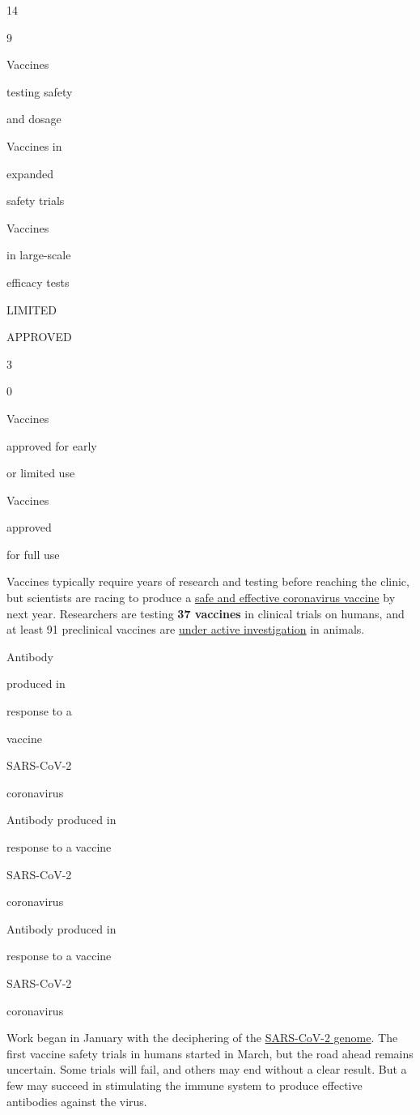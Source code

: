 14

9

Vaccines

testing safety

and dosage

Vaccines in

expanded

safety trials

Vaccines

in large-scale

efficacy tests

LIMITED

APPROVED

3

0

Vaccines

approved for early

or limited use

Vaccines

approved

for full use

Vaccines typically require years of research and testing before reaching
the clinic, but scientists are racing to produce a
\href{https://www.nytimes3xbfgragh.onion/interactive/2020/05/20/science/coronavirus-vaccine-development.html}{safe
and effective coronavirus vaccine} by next year. Researchers are testing
\textbf{37 vaccines} in clinical trials on humans, and at least 91
preclinical vaccines are
\href{https://www.nytimes3xbfgragh.onion/2020/08/27/health/covid-19-vaccines.html}{under
active investigation} in animals.

Antibody

produced in

response to a

vaccine

SARS-CoV-2

coronavirus

Antibody produced in

response to a vaccine

SARS-CoV-2

coronavirus

Antibody produced in

response to a vaccine

SARS-CoV-2

coronavirus

Work began in January with the deciphering of the
\href{https://www.nytimes3xbfgragh.onion/interactive/2020/04/03/science/coronavirus-genome-bad-news-wrapped-in-protein.html}{SARS-CoV-2
genome}. The first vaccine safety trials in humans started in March, but
the road ahead remains uncertain. Some trials will fail, and others may
end without a clear result. But a few may succeed in stimulating the
immune system to produce effective antibodies against the virus.


